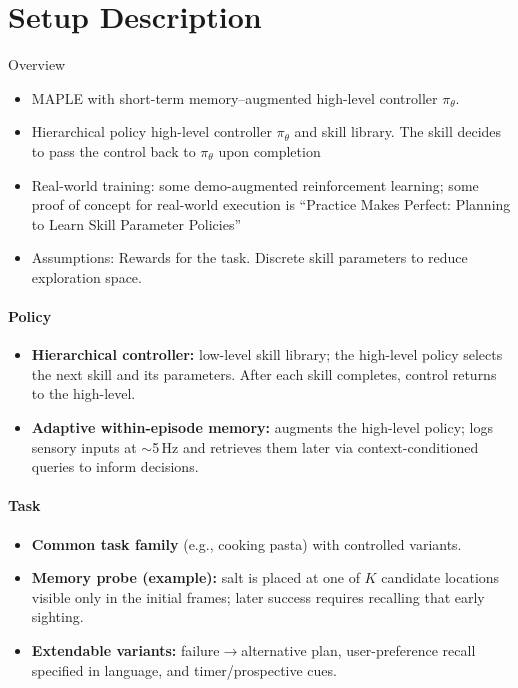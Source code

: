 \section{Setup Description}
Overview
\begin{itemize}[itemsep=2pt, topsep=0pt, parsep=0pt]
    \item MAPLE with short-term memory--augmented high-level controller \( \pi_\theta \).
    \item  Hierarchical policy high-level controller \( \pi_\theta \) and skill library. The skill decides to pass the control back to \( \pi_\theta \) upon completion
    \item Real-world training: some demo-augmented reinforcement learning; some proof of concept for real-world execution is ``Practice Makes Perfect: Planning to Learn Skill Parameter Policies''
    \item Assumptions: Rewards for the task. Discrete skill parameters to reduce exploration space.
\end{itemize}
\paragraph{Policy}
\begin{itemize}[itemsep=2pt, topsep=2pt, leftmargin=12pt]
  \item \textbf{Hierarchical controller:} low-level skill library; the high-level policy selects the next skill and its parameters. After each skill completes, control returns to the high-level.
  \item \textbf{Adaptive within-episode memory:} augments the high-level policy; logs sensory inputs at $\sim$5\,Hz and retrieves them later via context-conditioned queries to inform decisions.
\end{itemize}

\paragraph{Task}
\begin{itemize}[itemsep=2pt, topsep=2pt, leftmargin=12pt]
  \item \textbf{Common task family} (e.g., cooking pasta) with controlled variants.
  \item \textbf{Memory probe (example):} salt is placed at one of $K$ candidate locations visible only in the initial frames; later success requires recalling that early sighting.
  \item \textbf{Extendable variants:} failure$\rightarrow$alternative plan, user-preference recall specified in language, and timer/prospective cues.
\end{itemize}

